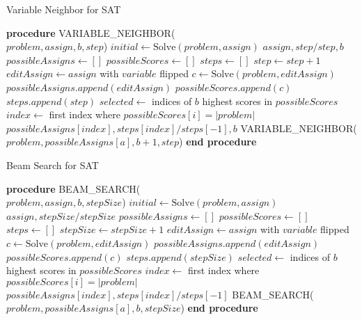 \documentclass[conference]{IEEEtran}
\begin{document}
\begin{algorithm}[t]
\caption{Variable Neighbor for SAT}
\begin{algorithmic}[1]
\STATE \textbf{procedure} VARIABLE\_NEIGHBOR(\\
\hspace{1.2em}$problem, assign, b, step$)
\STATE $initial \leftarrow \text{Solve}(problem, assign)$
    \RETURN $assign, step / step, b$
\ENDIF
\STATE $possibleAssigns \leftarrow []$
\STATE $possibleScores \leftarrow []$
\STATE $steps \leftarrow []$
    \STATE $step \leftarrow step + 1$
    \STATE $editAssign \leftarrow assign$ with $variable$ flipped
    \STATE $c \leftarrow \text{Solve}(problem, editAssign)$
    \STATE $possibleAssigns.append(editAssign)$
    \STATE $possibleScores.append(c)$
    \STATE $steps.append(step)$
\ENDFOR
\STATE $selected \leftarrow$ indices of $b$ highest scores in $possibleScores$
    \STATE $index \leftarrow$ first index where $possibleScores[i] = |problem|$
    \RETURN \\
    \hspace{1.2em}$possibleAssigns[index], steps[index] / steps[-1], b$
\ELSE
        \RETURN VARIABLE\_NEIGHBOR(\\
        \hspace{1.2em}$problem, possibleAssigns[a], b + 1, step$)
    \ENDFOR
\ENDIF
\STATE \textbf{end procedure}
\end{algorithmic}
\end{algorithm}


\begin{algorithm}
\caption{Beam Search for SAT}
\begin{algorithmic}[1]
\STATE \textbf{procedure} BEAM\_SEARCH(\\
\hspace{1.2em}$problem, assign, b, stepSize$)
\STATE $initial \leftarrow \text{Solve}(problem, assign)$
    \RETURN $assign, stepSize / stepSize$
\ENDIF
\STATE $possibleAssigns \leftarrow []$
\STATE $possibleScores \leftarrow []$
\STATE $steps \leftarrow []$
    \STATE $stepSize \leftarrow stepSize + 1$
    \STATE $editAssign \leftarrow assign$ with $variable$ flipped
    \STATE $c \leftarrow \text{Solve}(problem, editAssign)$
    \STATE $possibleAssigns.append(editAssign)$
    \STATE $possibleScores.append(c)$
    \STATE $steps.append(stepSize)$
\ENDFOR
\STATE $selected \leftarrow$ indices of $b$ highest scores in $possibleScores$
    \STATE $index \leftarrow$ first index where $possibleScores[i] = |problem|$
    \RETURN $possibleAssigns[index], steps[index] / steps[-1]$
\ELSE
        \RETURN BEAM\_SEARCH(\\
        \hspace{1.2em}$problem, possibleAssigns[a], b, stepSize$)
    \ENDFOR
\ENDIF
\STATE \textbf{end procedure}
\end{algorithmic}
\end{algorithm}
\end{document}
